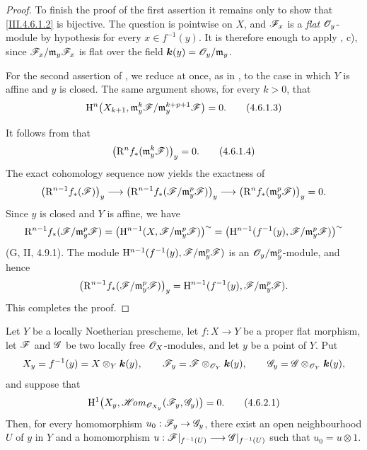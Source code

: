 \begin{proof}
To finish the proof of the first assertion it remains only to show
that \eqref{III.4.6.1.2} is bijective.  The question is pointwise on
$X$, and $\mathscr{F}_x$ is a \emph{flat} $\mathscr{O}_y$-module by hypothesis for
every $x\in f^{-1}(y)$.  It is therefore enough to apply
, c), since
$\mathscr{F}_x/\mathfrak m_y\mathscr{F}_x$ is flat over the field
$\boldsymbol{k}(y)=\mathscr{O}_y/\mathfrak m_y$.

For the second assertion of , we reduce at once, as
in , to the case in which $Y$ is affine and $y$ is
closed.  The same argument shows, for every $k>0$, that
\[
\label{III.4.6.1.3}
  \mathrm{H}^n\bigl(X_{k+1},
    \mathfrak m_y^k\mathscr{F}/
      \mathfrak m_y^{k+p+1}\mathscr{F}\bigr)=0.
  \tag{4.6.1.3}
\]


It follows from  that
\[
\label{III.4.6.1.4}
  \bigl(\mathrm{R}^n f_*(\mathfrak m_y^k\mathscr{F})\bigr)_y=0.
  \tag{4.6.1.4}
\]
The exact cohomology sequence now yields the exactness of
\[
  \bigl(\mathrm{R}^{n-1}f_*(\mathscr{F})\bigr)_y
  \longrightarrow
  \bigl(\mathrm{R}^{n-1}f_*
    (\mathscr{F}/\mathfrak m_y^p\mathscr{F})\bigr)_y
  \longrightarrow
  \bigl(\mathrm{R}^n f_*(\mathfrak m_y^p\mathscr{F})\bigr)_y=0.
\]
Since $y$ is closed and $Y$ is affine, we have
\[
  \mathrm{R}^{n-1}f_*(\mathscr{F}/\mathfrak m_y^p\mathscr{F})
  =
  \bigl(\mathrm{H}^{n-1}
    (X,\mathscr{F}/\mathfrak m_y^p\mathscr{F})\bigr)^{\sim}
  =
  \bigl(\mathrm{H}^{n-1}
    (f^{-1}(y),\mathscr{F}/\mathfrak m_y^p\mathscr{F})\bigr)^{\sim}
\]
(G, II, 4.9.1).  The module $\mathrm{H}^{n-1}
(f^{-1}(y),\mathscr{F}/\mathfrak m_y^p\mathscr{F})$
is an $\mathscr{O}_y/\mathfrak m_y^p$-module, and hence
\[
  \bigl(\mathrm{R}^{n-1}f_*
    (\mathscr{F}/\mathfrak m_y^p\mathscr{F})\bigr)_y
  =
  \mathrm{H}^{n-1}
    (f^{-1}(y),\mathscr{F}/\mathfrak m_y^p\mathscr{F}).
\]
This completes the proof.
\end{proof}

\begin{corollary}[4.6.2]
\label{III.4.6.2}
Let $Y$ be a locally Noetherian prescheme, let $f:X\to Y$ be a
proper flat morphism, let $\mathscr{F}$ and $\mathscr{G}$ be two locally free
$\mathscr{O}_X$-modules, and let $y$ be a point of $Y$.  Put
\[
  X_y=f^{-1}(y)=X\otimes_Y\boldsymbol{k}(y),\qquad
  \mathscr{F}_y=\mathscr{F}\otimes_{\mathscr{O}_Y}\boldsymbol{k}(y),\qquad
  \mathscr{G}_y=\mathscr{G}\otimes_{\mathscr{O}_Y}\boldsymbol{k}(y),
\]
and suppose that
\[
\label{III.4.6.2.1}
  \mathrm{H}^1\bigl(
    X_y,\mathscr{H}\!\mathit{om}_{\mathscr{O}_{X_y}}(\mathscr{F}_y,\mathscr{G}_y)
  \bigr)=0.
  \tag{4.6.2.1}
\]
Then, for every homomorphism $u_0:\mathscr{F}_y\to\mathscr{G}_y$, there exist
an open neighbourhood $U$ of $y$ in $Y$ and a homomorphism $u:\mathscr{F}|_{f^{-1}(U)}\longrightarrow
\mathscr{G}|_{f^{-1}(U)}$
such that $u_0=u\otimes1$.
\end{corollary}

